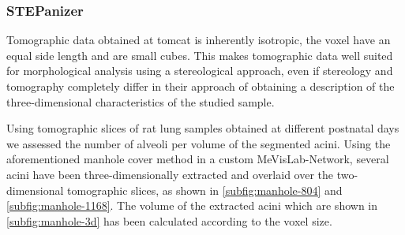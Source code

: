 
\subsubsection{STEPanizer}
Tomographic data obtained at \ac{tomcat} is inherently isotropic, \ie the voxel have an equal side length and are small cubes. This makes tomographic data well suited for morphological analysis using a stereological approach, even if stereology and tomography completely differ in their approach of obtaining a description of the three-dimensional characteristics of the studied sample.

Using tomographic slices of rat lung samples obtained at different postnatal days we assessed the number of alveoli per volume of the segmented acini. Using the aforementioned manhole cover method in a custom MeVisLab-Network, several acini have been three-dimensionally extracted and overlaid over the two-dimensional tomographic slices, as shown in \autoref{subfig:manhole-804} and \ref{subfig:manhole-1168}. The volume of the extracted acini which are shown in \autoref{subfig:manhole-3d} has been calculated according to the voxel size.

